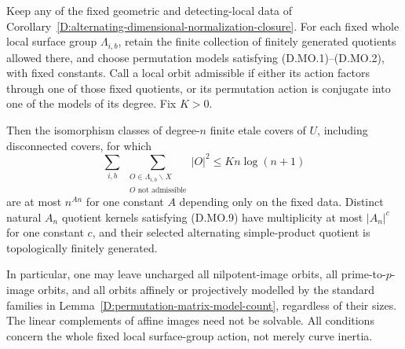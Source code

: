 \begin{theorem}
\label{D:alternating-compressed-local-orbits}
Keep any of the fixed geometric and detecting-local data of
Corollary~\ref{D:alternating-dimensional-normalization-closure}.
For each fixed whole local surface group $\Lambda_{i,b}$,
retain the finite collection of finitely generated quotients
allowed there, and choose permutation models satisfying
(D.MO.1)--(D.MO.2), with fixed constants. Call a local orbit
admissible if either its action factors through one of those
fixed quotients, or its permutation action is conjugate into
one of the models of its degree. Fix $K>0$.

Then the isomorphism classes of degree-$n$ finite etale covers
of $U$, including disconnected covers, for which
\[
    \sum_{i,b}\
    \sum_{\substack{O\in\Lambda_{i,b}\backslash X\\
                     O\text{ not admissible}}}|O|^2
                                \le K n\log(n+1)         \tag{D.MO.9}
\]
are at most $n^{A n}$ for one constant $A$ depending only
on the fixed data. Distinct natural $A_n$ quotient kernels
satisfying (D.MO.9) have multiplicity at most $|A_n|^c$
for one constant $c$, and their selected alternating
simple-product quotient is topologically finitely generated.

In particular, one may leave uncharged all nilpotent-image
orbits, all prime-to-$p$-image orbits, and all orbits
affinely or projectively modelled by the standard families
in Lemma~\ref{D:permutation-matrix-model-count}, regardless
of their sizes. The linear complements of affine images
need not be solvable. All conditions concern the whole
fixed local surface-group action, not merely curve inertia.
\end{theorem}

